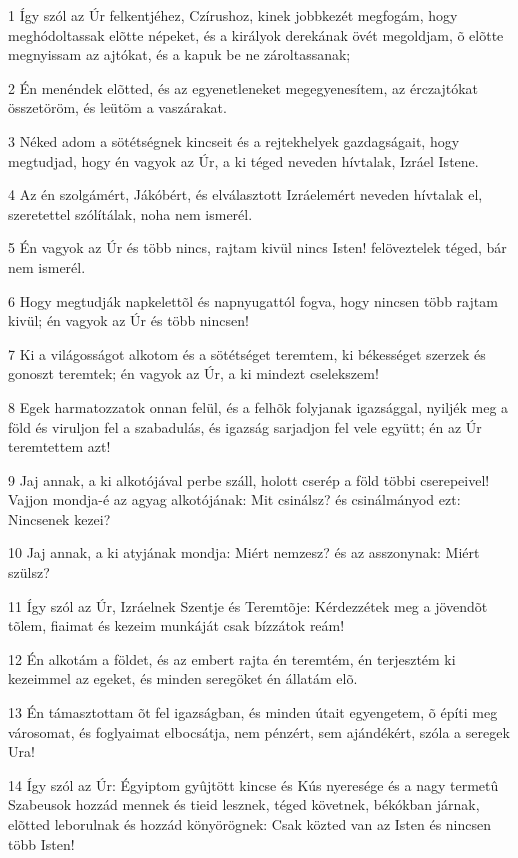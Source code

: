 \par 1 Így szól az Úr felkentjéhez, Czírushoz, kinek jobbkezét megfogám, hogy meghódoltassak elõtte népeket, és a királyok derekának övét megoldjam, õ elõtte megnyissam az ajtókat, és a kapuk be ne zároltassanak;
\par 2 Én menéndek elõtted, és az egyenetleneket megegyenesítem, az érczajtókat összetöröm, és leütöm a vaszárakat.
\par 3 Néked adom a sötétségnek kincseit és a rejtekhelyek gazdagságait, hogy megtudjad, hogy én vagyok az Úr, a ki téged neveden hívtalak, Izráel Istene.
\par 4 Az én szolgámért, Jákóbért, és elválasztott Izráelemért neveden hívtalak el, szeretettel szólítálak, noha nem ismerél.
\par 5 Én vagyok az Úr és több nincs, rajtam kivül nincs Isten! felöveztelek téged, bár nem ismerél.
\par 6 Hogy megtudják napkelettõl és napnyugattól fogva, hogy nincsen több rajtam kivül; én vagyok az Úr és több nincsen!
\par 7 Ki a világosságot alkotom és a sötétséget teremtem, ki békességet szerzek és gonoszt teremtek; én vagyok az Úr, a ki mindezt cselekszem!
\par 8 Egek harmatozzatok onnan felül, és a felhõk folyjanak igazsággal, nyiljék meg a föld és viruljon fel a szabadulás, és igazság sarjadjon fel vele együtt; én az Úr teremtettem azt!
\par 9 Jaj annak, a ki alkotójával perbe száll, holott cserép a föld többi cserepeivel! Vajjon mondja-é az agyag alkotójának: Mit csinálsz? és csinálmányod ezt: Nincsenek kezei?
\par 10 Jaj annak, a ki atyjának mondja: Miért nemzesz? és az asszonynak: Miért szülsz?
\par 11 Így szól az Úr, Izráelnek Szentje és Teremtõje: Kérdezzétek meg a jövendõt tõlem, fiaimat és kezeim munkáját csak bízzátok reám!
\par 12 Én alkotám a földet, és az embert rajta én teremtém, én terjesztém ki kezeimmel az egeket, és minden seregöket én állatám elõ.
\par 13 Én támasztottam õt fel igazságban, és minden útait egyengetem, õ építi meg városomat, és foglyaimat elbocsátja, nem pénzért, sem ajándékért, szóla a seregek Ura!
\par 14 Így szól az Úr: Égyiptom gyûjtött kincse és Kús nyeresége és a nagy termetû Szabeusok hozzád mennek és tieid lesznek, téged követnek, békókban járnak, elõtted leborulnak és hozzád könyörögnek: Csak közted van az Isten és nincsen több Isten!
